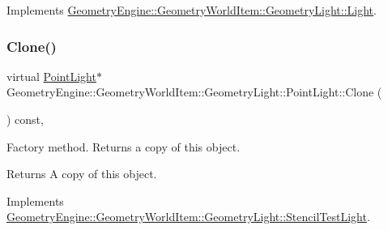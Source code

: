 Implements \mbox{\hyperlink{class_geometry_engine_1_1_geometry_world_item_1_1_geometry_light_1_1_light_a58aa2a3520f7aa2b03afcb4123e7530a}{Geometry\+Engine\+::\+Geometry\+World\+Item\+::\+Geometry\+Light\+::\+Light}}.

\mbox{\label{class_geometry_engine_1_1_geometry_world_item_1_1_geometry_light_1_1_point_light_a68321b758cff76fa55f3cd5ef2824035}} 
\subsubsection{\texorpdfstring{Clone()}{Clone()}}
{\footnotesize\ttfamily virtual \mbox{\hyperlink{class_geometry_engine_1_1_geometry_world_item_1_1_geometry_light_1_1_point_light}{Point\+Light}}$\ast$ Geometry\+Engine\+::\+Geometry\+World\+Item\+::\+Geometry\+Light\+::\+Point\+Light\+::\+Clone (\begin{DoxyParamCaption}{ }\end{DoxyParamCaption}) const\hspace{0.3cm}{\ttfamily [inline]}, {\ttfamily [virtual]}}

Factory method. Returns a copy of this object. \begin{DoxyReturn}{Returns}
A copy of this object. 
\end{DoxyReturn}


Implements \mbox{\hyperlink{class_geometry_engine_1_1_geometry_world_item_1_1_geometry_light_1_1_stencil_test_light_a6434a228dc64537ff9984c82eaf8ab07}{Geometry\+Engine\+::\+Geometry\+World\+Item\+::\+Geometry\+Light\+::\+Stencil\+Test\+Light}}.

\mbox{\label{class_geometry_engine_1_1_geometry_world_item_1_1_geometry_light_1_1_point_light_ab0ed78036120211285fffdde1408352e}} 
